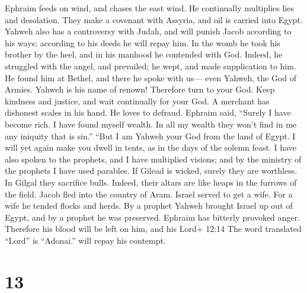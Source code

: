 Ephraim feeds on wind, and chases the east wind. He
continually multiplies lies and desolation. They make a covenant with
Assyria, and oil is carried into Egypt.  Yahweh also has a
controversy with Judah, and will punish Jacob according to his ways;
according to his deeds he will repay him.  In the womb he
took his brother by the heel, and in his manhood he contended with God.
 Indeed, he struggled with the angel, and prevailed; he
wept, and made supplication to him. He found him at Bethel, and there he
spoke with us---  even Yahweh, the God of Armies. Yahweh is
his name of renown!  Therefore turn to your God. Keep
kindness and justice, and wait continually for your God.  A
merchant has dishonest scales in his hand. He loves to defraud.
 Ephraim said, ``Surely I have become rich. I have found
myself wealth. In all my wealth they won't find in me any iniquity that
is sin.''  ``But I am Yahweh your God from the land of
Egypt. I will yet again make you dwell in tents, as in the days of the
solemn feast.  I have also spoken to the prophets, and I
have multiplied visions; and by the ministry of the prophets I have used
parables.  If Gilead is wicked, surely they are worthless.
In Gilgal they sacrifice bulls. Indeed, their altars are like heaps in
the furrows of the field.  Jacob fled into the country of
Aram. Israel served to get a wife. For a wife he tended flocks and
herds.  By a prophet Yahweh brought Israel up out of Egypt,
and by a prophet he was preserved.  Ephraim has bitterly
provoked anger. Therefore his blood will be left on him, and his Lord+
12:14 The word translated ``Lord'' is ``Adonai.'' will repay his
contempt.

\hypertarget{section-7}{%
\section{13}\label{section-7}}

